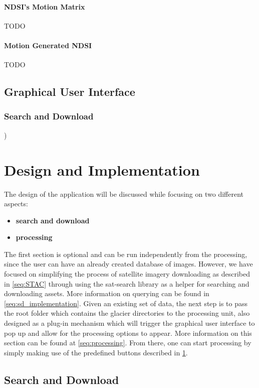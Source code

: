\documentclass[11pt, a4paper]{report}
\begin{document}
	\subsubsection{NDSI's Motion Matrix}
	\label{seq:ndsi_motion_matrix}
	TODO
	\subsubsection{Motion Generated NDSI}
	\label{seq:motion_generated_gui}
	TODO
	\section{Graphical User Interface}
	\label{seq:gui}
	\subsection{Search and Download}
	\label{seq:search_download})

	\chapter{Design and Implementation}
	\label{cha:design_and_implementation}
	
	The design of the application will be discussed while focusing on two different aspects:
	\begin{itemize}
		\item \textbf{search and download}
		\item \textbf{processing}
	\end{itemize}
	The first section is optional and can be run independently from the processing, since the user can have an already created database of images. However, we have focused on simplifying the process of satellite imagery downloading as described in \ref{seq:STAC} through using the sat-search library as a helper for searching and downloading assets. More information on querying can be found in \ref{seq:sd_implementation}. 
	Given an existing set of data, the next step is to pass the root folder which contains the glacier directories to the processing unit, also designed as a plug-in mechanism which will trigger the graphical user interface to pop up and allow for the processing options to appear. More information on this section can be found at \ref{seq:processing}. From there, one can start processing by simply making use of the predefined buttons described in \ref{seq:gui}.
	
	\section{Search and Download}
	
\end{document}
